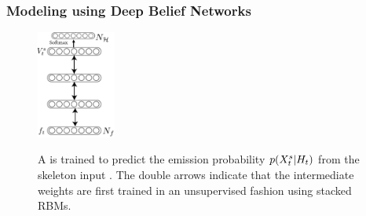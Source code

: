 \subsubsection{Modeling \randomvariableSK{} using Deep Belief Networks}

\begin{figure}[t]
  \centering
  \includegraphics[width=0.23\textwidth]{images/DBN}\\
  \caption{
  A \DBN is trained to predict the emission probability  $p(X^{s}_t|H_t)$
  from the  skeleton input \skfeature.
  The double arrows indicate that the intermediate weights are first trained in an unsupervised fashion using stacked RBMs.
}
    \label{fig:DBN}
\end{figure}
%

